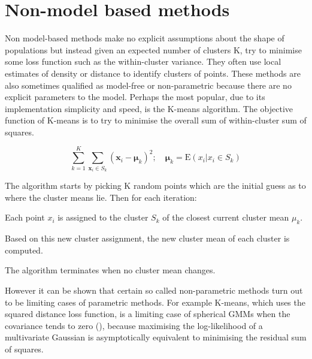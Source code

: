 \section{Non-model based methods}

Non model-based methods make no explicit assumptions about the shape of populations but instead
given an expected number of clusters K, try to minimise some loss function such as the within-cluster variance.
They often use local estimates of density or distance to identify clusters of points.
These methods are also sometimes qualified as model-free or non-parametric because there are no explicit parameters to the model.
Perhaps the most popular, due to its implementation simplicity and speed, is the K-means algorithm.
The objective function of K-means is to try to minimise the overall sum of within-cluster sum of squares.

\[
    \sum_{k=1}^{K} \sum_{\mathbf x_i \in S_k} ( \mathbf x_i - \boldsymbol\mu_k )^2 ; \quad \boldsymbol\mu_k=\text{E}(x_i| x_i \in S_k)
\]

The algorithm starts by picking K random points which are the initial guess as to where the cluster means lie.
Then for each iteration:
\begin{itemise}
    \item Each point $x_i$ is assigned to the cluster $S_k$ of the closest current cluster mean $\mu_k$.
    \item Based on this new cluster assignment, the new cluster mean of each cluster is computed.
\end{itemise}
The algorithm terminates when no cluster mean changes.

However it can be shown that certain so called non-parametric methods turn out to be limiting cases of parametric methods.
For example K-means, which uses the squared distance loss function, is a limiting case of spherical \glspl{GMM} when the covariance tends to zero (),
because maximising the log-likelihood of a multivariate Gaussian is asymptotically equivalent to minimising the residual sum of squares.

